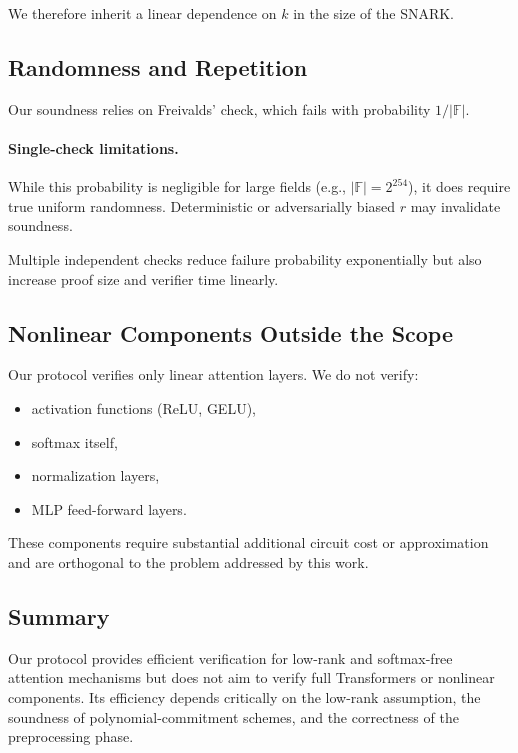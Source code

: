 \documentclass[11pt]{article}
\begin{document}
We therefore inherit a linear dependence on $k$ in the size of the
SNARK.

\subsection{Randomness and Repetition}

Our soundness relies on Freivalds’ check, which fails with probability
$1/|\mathbb{F}|$.

\paragraph{Single-check limitations.}
While this probability is negligible for large fields (e.g., $|\mathbb{F}| = 2^{254}$),
it does require true uniform randomness.  
Deterministic or adversarially biased $r$ may invalidate soundness.

Multiple independent checks reduce failure probability exponentially but
also increase proof size and verifier time linearly.

\subsection{Nonlinear Components Outside the Scope}

Our protocol verifies only linear attention layers.
We do not verify:

\begin{itemize}
  \item activation functions (ReLU, GELU),
  \item softmax itself,
  \item normalization layers,
  \item MLP feed-forward layers.
\end{itemize}

These components require substantial additional circuit cost or
approximation and are orthogonal to the problem addressed by this work.

\subsection{Summary}

Our protocol provides efficient verification for low-rank and
softmax-free attention mechanisms but does not aim to verify full
Transformers or nonlinear components.  
Its efficiency depends critically on the low-rank assumption, the
soundness of polynomial-commitment schemes, and the correctness of the
preprocessing phase.
\end{document}
